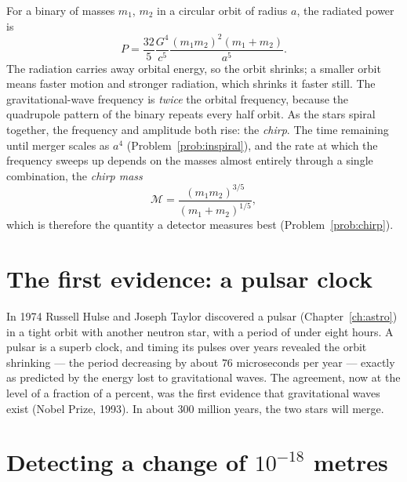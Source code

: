 For a binary of masses $m_1$, $m_2$ in a circular orbit of radius $a$, the radiated power is
\[
  P = \frac{32}{5}\frac{G^4}{c^5}\frac{(m_1m_2)^2(m_1+m_2)}{a^5} .
\]
The radiation carries away orbital energy, so the orbit shrinks; a smaller orbit means faster motion and stronger radiation, which shrinks it faster still. The gravitational-wave frequency is \emph{twice} the orbital frequency, because the quadrupole pattern of the binary repeats every half orbit. As the stars spiral together, the frequency and amplitude both rise: the \emph{chirp}. The time remaining until merger scales as $a^4$ (Problem~\ref{prob:inspiral}), and the rate at which the frequency sweeps up depends on the masses almost entirely through a single combination, the \emph{chirp mass}
\[
  \mathcal M = \frac{(m_1m_2)^{3/5}}{(m_1+m_2)^{1/5}},
\]
which is therefore the quantity a detector measures best (Problem~\ref{prob:chirp}).

\section{The first evidence: a pulsar clock}

In 1974 Russell Hulse and Joseph Taylor discovered a pulsar (Chapter~\ref{ch:astro}) in a tight orbit with another neutron star, with a period of under eight hours. A pulsar is a superb clock, and timing its pulses over years revealed the orbit shrinking --- the period decreasing by about $76$ microseconds per year --- exactly as predicted by the energy lost to gravitational waves. The agreement, now at the level of a fraction of a percent, was the first evidence that gravitational waves exist (Nobel Prize, 1993). In about $300$ million years, the two stars will merge.

\section{Detecting a change of $10^{-18}$ metres}

